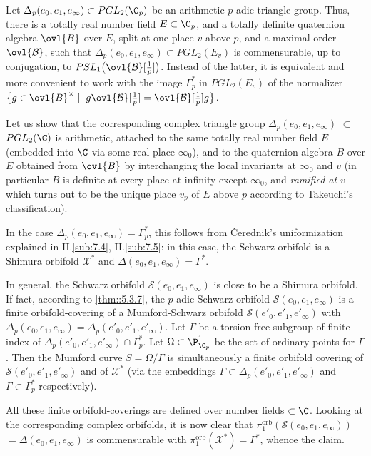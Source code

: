 \begin{para}\label{para::5.5.2} Let $\Delta_p(e_0,e_1,e_\infty)\subset
 PGL_2(\C_p)$ be an arithmetic $p$-adic triangle group. Thus, there is a
 totally real number field $E \subset \C_p$, and a totally definite
 quaternion algebra $\ovl{B}$ over $E$, split at one place $v$ above $p$,
 and a maximal order $\ovl{\mathcal{B}}$, such that
 $\Delta_p(e_0,e_1,e_\infty)\subset PGL_2(E_v)$ is commensurable, up to
 conjugation, to
 $PSL_1\bigl(\ovl{\mathcal{B}}[\frac{1}{p}]\bigr)$. Instead of the 
 latter, it is equivalent and more convenient to work with the image
 $\Gamma_p^\ast$ in $PGL_2(E_v)$ of the normalizer $\bigl\{g\in
 \ovl{B}^\times\mid 
 \;g\ovl{\mathcal{B}}[\frac{1}{p}]=\ovl{\mathcal{B}}[\frac{1}{p}]g\bigr\}$.

 Let us show that the corresponding complex triangle group
 $\Delta_p(e_0,e_1,e_\infty)$ $\subset$ $PGL_2(\C)$ is arithmetic, attached
 to the same totally real number field $E$ (embedded into $\C$ via some
 real place $\infty_0$), and to the quaternion algebra $B$ over $E$
 obtained from $\ovl{B}$ by interchanging the local invariants at
 $\infty_0$ and $v$ (in particular $B$ is definite at every place at
 infinity except $\infty_0$, and {\it ramified at $v$} --- which turns out
 to be the unique place $v_p$ of $E$ above $p$ according to Takeuchi's
 classification).
 
 In the case $\Delta_p(e_0,e_1,e_\infty)=\Gamma_p^\ast$, this follows
 from \v{C}erednik's uniformization explained in  II.\ref{sub:7.4},
 II.\ref{sub:7.5}: in this 
 case, the Schwarz orbifold is a Shimura orbifold $\mathcal{X}^\ast$ and
 $\Delta(e_0,e_1,e_\infty)=\Gamma^\ast$.

 In general, the Schwarz
 orbifold $\mathcal{S}(e_0,e_1,e_\infty)$ is close to be a Shimura
 orbifold.  If fact, according to \ref{thm::5.3.7}, the $p$-adic Schwarz
 orbifold 
 $\mathcal{S}(e_0,e_1,e_\infty)$ is a finite orbifold-covering of a
 Mumford-Schwarz orbifold $\mathcal{S}(e'_0,e'_1,e'_\infty)$ with
 $\Delta_p(e_0,e_1,e_\infty)=\Delta_p(e'_0,e'_1,e'_\infty)$. Let $\Gamma$
 be a torsion-free subgroup of finite index of
 $\Delta_p(e'_0,e'_1,e'_\infty)\cap \Gamma_p^\ast$. Let $\Omega \subset
 \P^1_{\C_p}$ be the set of ordinary points for $\Gamma$. Then the
 Mumford curve $S=\Omega/\Gamma$ is simultaneously a finite orbifold
 covering of $\mathcal{S}(e'_0,e'_1,e'_\infty)$ and of $\mathcal{X}^\ast$
 (via the embeddings $\Gamma \subset \Delta_p(e'_0,e'_1,e'_\infty)$ and
 $\Gamma \subset \Gamma_p^\ast$ respectively).

 All these finite orbifold-coverings are defined over number
 fields $\subset \C$. Looking at the corresponding complex orbifolds, it
 is now clear that $\pi_1^{\mathrm{orb}}(\mathcal{S}(e_0,e_1,e_\infty))$
 $=\Delta(e_0,e_1,e_\infty)$ is commensurable with
 $\pi_1^{\mathrm{orb}}(\mathcal{X}^\ast)= \Gamma ^\ast$, whence the claim.
\end{para}

